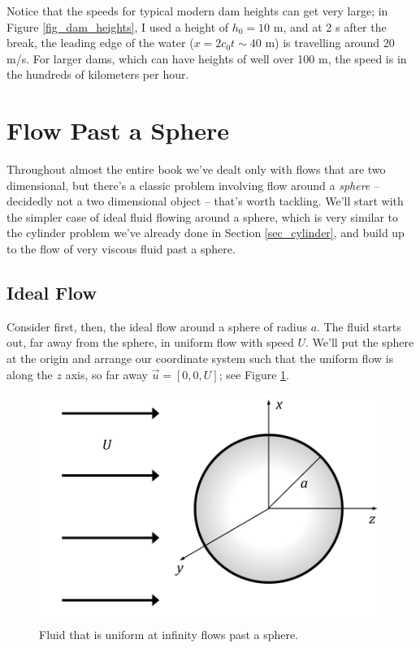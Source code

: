 Notice that the speeds for typical modern dam heights can get very large; in Figure \ref{fig_dam_heights}, I used a height of $h_0 = 10$ m, and at 2 s after the break, the leading edge of the water ($x = 2c_0 t \sim 40$ m) is travelling around 20 m/s.  For larger dams, which can have heights of well over 100 m, the speed is in the hundreds of kilometers per hour.




%
% 


\section{Flow Past a Sphere}

Throughout almost the entire book we've dealt only with flows that are two dimensional, but there's a classic problem involving flow around a \emph{sphere} -- decidedly not a two dimensional object -- that's worth tackling.  We'll start with the simpler case of ideal fluid flowing around a sphere, which is very similar to the cylinder problem we've already done in Section \ref{sec_cylinder}, and build up to the flow of very viscous fluid past a sphere.

\subsection{Ideal Flow}
\label{sec_sphere_ideal}

Consider first, then, the ideal flow around a sphere of radius $a$.  The fluid starts out, far away from the sphere, in uniform flow with speed $U$.  We'll put the sphere at the origin and arrange our coordinate system such that the uniform flow is along the $z$ axis, so far away $\vec{u} = [0, 0, U]$; see Figure \ref{fig_sphere_setup}.

\begin{figure}
\centering
\includegraphics[width=0.8\linewidth]{Figures/Chapter6/fig_sphere_setup}
\caption{Fluid that is uniform at infinity flows past a sphere.}
\label{fig_sphere_setup}
\end{figure}

